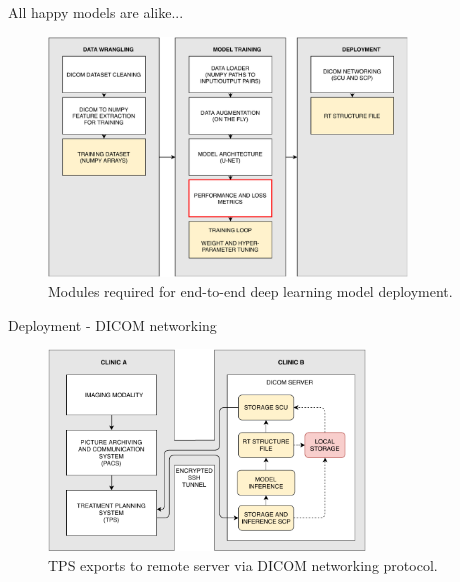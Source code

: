 \documentclass[9pt]{beamer}
\begin{document}
\begin{frame}{All happy models are alike...}
  \begin{figure}
    \includegraphics[width=0.85\textwidth]{images/modules_loss}
    \caption{Modules required for end-to-end deep learning model deployment.}
  \end{figure}
\end{frame}


\begin{frame}{Deployment - DICOM networking}
\begin{figure}
\includegraphics[width=0.75\textwidth]{images/dicom_networking}
\caption{TPS exports to remote server via DICOM networking protocol.}
\end{figure}
\end{frame}
%

\end{document}
